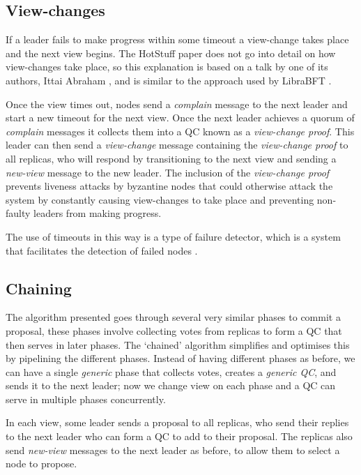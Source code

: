 \subsection{View-changes} \label{viewchange}
If a leader fails to make progress within some timeout a view-change takes place and the next view begins. The HotStuff paper does not go into detail on how view-changes take place, so this explanation is based on a talk by one of its authors, Ittai Abraham \cite{ittai}, and is similar to the approach used by LibraBFT \cite{baudet_state_nodate}.

Once the view times out, nodes send a \textit{complain} message to the next leader and start a new timeout for the next view. Once the next leader achieves a quorum of \textit{complain} messages it collects them into a QC known as a \textit{view-change proof}. This leader can then send a \textit{view-change} message containing the \textit{view-change proof} to all replicas, who will respond by transitioning to the next view and sending a \textit{new-view} message to the new leader. The inclusion of the \textit{view-change proof} prevents liveness attacks by byzantine nodes that could otherwise attack the system by constantly causing view-changes to take place and preventing non-faulty leaders from making progress.

The use of timeouts in this way is a type of failure detector, which is a system that facilitates the detection of failed nodes \cite{chandra_weakest_1996}\cite{chandra_unreliable_1996}.

\subsection{Chaining} \label{chaining}

The algorithm presented goes through several very similar phases to commit a proposal, these phases involve collecting votes from replicas to form a QC that then serves in later phases. The `chained' algorithm simplifies and optimises this by pipelining the different phases. Instead of having different phases as before, we can have a single \textit{generic} phase that collects votes, creates a \textit{generic QC}, and sends it to the next leader; now we change view on each phase and a QC can serve in multiple phases concurrently.

In each view, some leader sends a proposal to all replicas, who send their replies to the next leader who can form a QC to add to their proposal. The replicas also send \textit{new-view} messages to the next leader as before, to allow them to select a node to propose.

